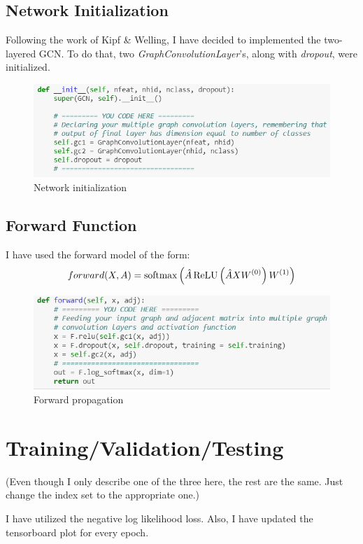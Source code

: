 \subsection{Network Initialization}

Following the work of Kipf \& Welling\cite{Kipf2017}, I have decided to implemented the two-layered GCN. To do that, two {\it GraphConvolutionLayer}'s, along with {\it dropout}, were initialized.

\begin{figure}[htbp]
\centering
\includegraphics[width=0.6\linewidth]{implementation/fig/code4.png}
\caption{Network initialization}
\label{fig:code4}
\end{figure}

\subsection{Forward Function}

I have used the forward model of the form:
$$forward(X, A) = \operatorname{softmax}\left(\hat{A}  \operatorname{ReLU}\left( \hat{A} X W^{(0)} \right) W^{(1)} \right)$$

\begin{figure}[htbp]
\centering
\includegraphics[width=0.6\linewidth]{implementation/fig/code5.png}
\caption{Forward propagation}
\label{fig:code5}
\end{figure}

\section{Training/Validation/Testing}

(Even though I only describe one of the three here, the rest are the same. Just change the index set to the appropriate one.)

I have utilized the negative log likelihood loss. Also, I have updated the tensorboard plot for every epoch.

